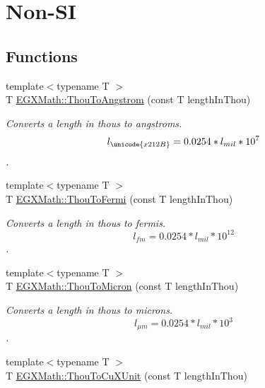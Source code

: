 \hypertarget{group___e_g_x_math-_conversions-_length_conversions-_imperial-_thou-_non-_s_i}{}\section{Non-\/\+SI}
\label{group___e_g_x_math-_conversions-_length_conversions-_imperial-_thou-_non-_s_i}
\subsection*{Functions}
\begin{DoxyCompactItemize}
\item 
{\footnotesize template$<$typename T $>$ }\\T \mbox{\hyperlink{group___e_g_x_math-_conversions-_length_conversions-_imperial-_thou-_non-_s_i_ga5d852bdec8556e4b6bde1445f5f74a20}{E\+G\+X\+Math\+::\+Thou\+To\+Angstrom}} (const T length\+In\+Thou)
\begin{DoxyCompactList}\small\item\em Converts a length in thous to angstroms. \[ l_{\unicode{x212B}}=0.0254 * l_{mil} * 10^{7} \]. \end{DoxyCompactList}\item 
{\footnotesize template$<$typename T $>$ }\\T \mbox{\hyperlink{group___e_g_x_math-_conversions-_length_conversions-_imperial-_thou-_non-_s_i_ga4a134cf9b956cd51e579dc65b4fd7774}{E\+G\+X\+Math\+::\+Thou\+To\+Fermi}} (const T length\+In\+Thou)
\begin{DoxyCompactList}\small\item\em Converts a length in thous to fermis. \[ l_{fm}=0.0254 * l_{mil} * 10^{12} \]. \end{DoxyCompactList}\item 
{\footnotesize template$<$typename T $>$ }\\T \mbox{\hyperlink{group___e_g_x_math-_conversions-_length_conversions-_imperial-_thou-_non-_s_i_ga7f43c9a1cbb845911bdcbbbe388347a1}{E\+G\+X\+Math\+::\+Thou\+To\+Micron}} (const T length\+In\+Thou)
\begin{DoxyCompactList}\small\item\em Converts a length in thous to microns. \[ l_{\mu m}=0.0254 * l_{mil} * 10^{3} \]. \end{DoxyCompactList}\item 
{\footnotesize template$<$typename T $>$ }\\T \mbox{\hyperlink{group___e_g_x_math-_conversions-_length_conversions-_imperial-_thou-_non-_s_i_ga5614deb555c0360dfdaa94d01ad35b17}{E\+G\+X\+Math\+::\+Thou\+To\+Cu\+X\+Unit}} (const T length\+In\+Thou)

\end{DoxyCompactItemize}
